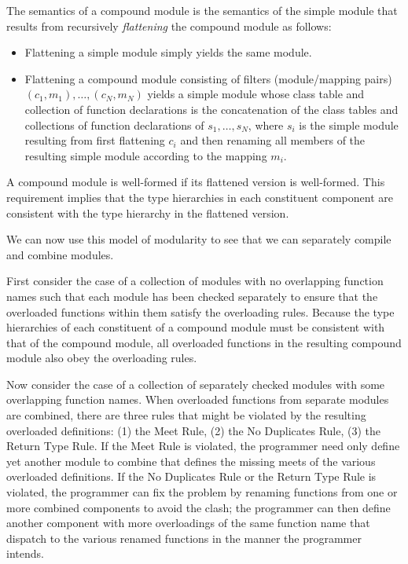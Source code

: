 The semantics of a compound module is the semantics of the simple module
that results from recursively \emph{flattening} the compound module as follows:
\begin{itemize}

\item
Flattening a simple module simply yields the same module.

\item Flattening a compound module 
consisting of filters (module/mapping pairs) $(c_1, m_1), \ldots, (c_N, m_N)$
yields a simple module whose class table and collection of function declarations
is the concatenation of the class tables and collections of function declarations
of $s_1, \ldots, s_N$, where $s_i$ is the simple module resulting from
first flattening $c_i$ and then renaming all members
of the resulting simple module according to the mapping $m_i$.

\end{itemize}
A compound module is well-formed if its flattened version is well-formed.
This requirement implies that the type hierarchies in each constituent component 
are consistent with the type hierarchy in the flattened version.

We can now use this model of modularity to see 
that we can separately compile and combine modules.

First consider the case of a collection of modules with no overlapping function names
such that each module has been checked separately 
to ensure that the overloaded functions within them satisfy the overloading rules.
Because the type hierarchies of each constituent of a compound module 
must be consistent with that of the compound module, 
all overloaded functions in the resulting compound module
also obey the overloading rules.

Now consider the case of a collection of separately checked modules 
with some overlapping function names.
When overloaded functions from separate modules are combined, 
there are three rules that might be violated
by the resulting overloaded definitions: 
(1) the Meet Rule, (2) the No Duplicates Rule, (3) the Return Type Rule.
If the Meet Rule is violated, 
the programmer need only define yet another module to combine 
that defines the missing meets of the various overloaded definitions.
If the No Duplicates Rule or the Return Type Rule is violated, 
the programmer can fix the problem by renaming functions 
from one or more combined components to avoid the clash; 
the programmer can then define another component 
with more overloadings of the same function name 
that dispatch to the various renamed functions in the manner the programmer intends.

